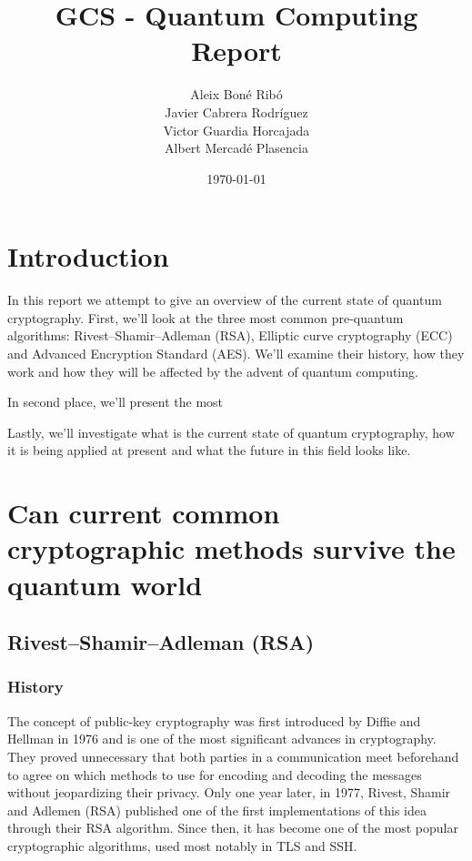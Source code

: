 
\usepackage{dsfont}



\title{
    GCS - Quantum Computing Report
}
\author{
Aleix Boné Ribó\\
Javier Cabrera Rodríguez\\
Victor Guardia Horcajada\\
Albert Mercadé Plasencia
}
\date{
    \today
}





\tableofcontents

\setlength{\parskip}{1em}

\pagebreak
\section{Introduction}%
\label{sec:introduction}

In this report we attempt to give an overview of the current state of quantum
cryptography. First, we’ll look at the three most common pre-quantum algorithms:
Rivest–Shamir–Adleman (RSA), Elliptic curve cryptography (ECC) and Advanced
Encryption Standard (AES). We’ll examine their history, how they work and how
they will be affected by the advent of quantum computing.

In second place, we’ll present the most %

Lastly, we’ll investigate what is the current state of quantum cryptography, how
it is being applied at present and what the future in this field looks like.


\section{Can current common cryptographic methods survive the quantum world}

\subsection{Rivest–Shamir–Adleman (RSA)}

\subsubsection{History}

The concept of public-key cryptography was first introduced by Diffie and
Hellman in 1976 and is one of the most significant advances in cryptography.
They proved unnecessary that both parties in a communication meet beforehand to
agree on which methods to use for encoding and decoding the messages without
jeopardizing their privacy. Only one year later, in 1977, Rivest, Shamir and
Adlemen (RSA) published one of the first implementations of this idea through
their RSA algorithm. Since then, it has become one of the most popular
cryptographic algorithms, used most notably in TLS and SSH.

